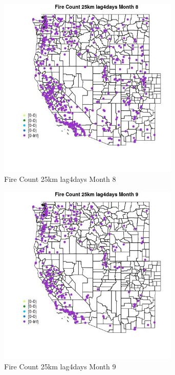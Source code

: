 \begin{figure} 
\centering  
\includegraphics[width=0.77\textwidth]{Code_Outputs/Report_ML_input_PM25_Step4_part_e_de_duplicated_aves_compiled_2019-05-18wNAs_MapObsMo8Fire_Count_25km_lag4days.jpg} 
\caption{\label{fig:Report_ML_input_PM25_Step4_part_e_de_duplicated_aves_compiled_2019-05-18wNAsMapObsMo8Fire_Count_25km_lag4days}Fire Count 25km lag4days Month 8} 
\end{figure} 
 

\begin{figure} 
\centering  
\includegraphics[width=0.77\textwidth]{Code_Outputs/Report_ML_input_PM25_Step4_part_e_de_duplicated_aves_compiled_2019-05-18wNAs_MapObsMo9Fire_Count_25km_lag4days.jpg} 
\caption{\label{fig:Report_ML_input_PM25_Step4_part_e_de_duplicated_aves_compiled_2019-05-18wNAsMapObsMo9Fire_Count_25km_lag4days}Fire Count 25km lag4days Month 9} 
\end{figure} 
 

